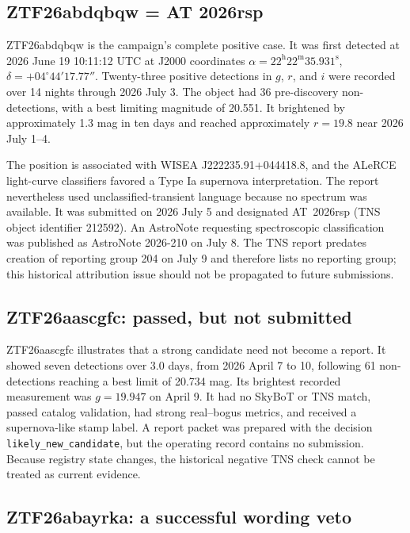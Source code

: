 \documentclass[11pt]{article}
\begin{document}
\subsection{ZTF26abdqbqw = AT 2026rsp}

ZTF26abdqbqw is the campaign's complete positive case. It was first detected at 2026 June 19 10:11:12 UTC at J2000 coordinates $\alpha=22^{\mathrm h}22^{\mathrm m}35.931^{\mathrm s}$, $\delta=+04^{\circ}44'17.77''$. Twenty-three positive detections in $g$, $r$, and $i$ were recorded over 14 nights through 2026 July 3. The object had 36 pre-discovery non-detections, with a best limiting magnitude of 20.551. It brightened by approximately 1.3 mag in ten days and reached approximately $r=19.8$ near 2026 July 1--4.

The position is associated with WISEA J222235.91+044418.8, and the ALeRCE light-curve classifiers favored a Type Ia supernova interpretation. The report nevertheless used unclassified-transient language because no spectrum was available. It was submitted on 2026 July 5 and designated AT~2026rsp (TNS object identifier 212592). An AstroNote requesting spectroscopic classification was published as AstroNote 2026-210 on July 8. The TNS report predates creation of reporting group 204 on July 9 and therefore lists no reporting group; this historical attribution issue should not be propagated to future submissions.

\subsection{ZTF26aascgfc: passed, but not submitted}

ZTF26aascgfc illustrates that a strong candidate need not become a report. It showed seven detections over 3.0 days, from 2026 April 7 to 10, following 61 non-detections reaching a best limit of 20.734 mag. Its brightest recorded measurement was $g=19.947$ on April 9. It had no SkyBoT or TNS match, passed catalog validation, had strong real--bogus metrics, and received a supernova-like stamp label. A report packet was prepared with the decision \texttt{likely\_new\_candidate}, but the operating record contains no submission. Because registry state changes, the historical negative TNS check cannot be treated as current evidence.

\subsection{ZTF26abayrka: a successful wording veto}
\end{document}
